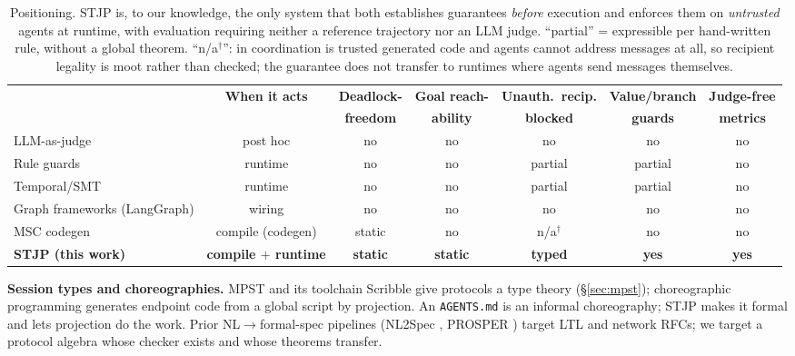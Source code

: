 \documentclass{article}
\newcommand{\stjp}{\textsc{STJP}}
\begin{document}
\begin{table}[t]
\centering\small
\caption{Positioning. \stjp{} is, to our knowledge, the only system that both establishes guarantees \emph{before} execution and enforces them on \emph{untrusted} agents at runtime, with evaluation requiring neither a reference trajectory nor an LLM judge. ``partial'' = expressible per hand-written rule, without a global theorem. ``n/a$^{\dagger}$'': in \citet{bollig26} coordination is trusted generated code and agents cannot address messages at all, so recipient legality is moot rather than checked; the guarantee does not transfer to runtimes where agents send messages themselves.}
\label{tab:position}
\begin{tabular}{@{}lcccccc@{}}
\toprule
& \textbf{When it acts} & \textbf{Deadlock-} & \textbf{Goal reach-} & \textbf{Unauth.\ recip.} & \textbf{Value/branch} & \textbf{Judge-free} \\
& & \textbf{freedom} & \textbf{ability} & \textbf{blocked} & \textbf{guards} & \textbf{metrics} \\
\midrule
LLM-as-judge & post hoc & no & no & no & no & no \\
Rule guards \citep{agentspec} & runtime & no & no & partial & partial & no \\
Temporal/SMT \citep{agentc} & runtime & no & no & partial & partial & no \\
Graph frameworks (LangGraph) & wiring & no & no & no & no & no \\
MSC codegen \citep{bollig26} & compile (codegen) & static & no & n/a$^{\dagger}$ & no & no \\
\textbf{\stjp{} (this work)} & \textbf{compile $+$ runtime} & \textbf{static} & \textbf{static} & \textbf{typed} & \textbf{yes} & \textbf{yes} \\
\bottomrule
\end{tabular}
\end{table}

\textbf{Session types and choreographies.} MPST \citep{hyc08,scalas19} and its toolchain Scribble \citep{scribble} give protocols a type theory (\S\ref{sec:mpst}); choreographic programming \citep{montesi23,carbone13} generates endpoint code from a global script by projection. An \texttt{AGENTS.md} is an informal choreography; \stjp{} makes it formal and lets projection do the work. Prior NL$\to$formal-spec pipelines (NL2Spec \citep{nl2spec}, PROSPER \citep{prosper}) target LTL and network RFCs; we target a protocol algebra whose checker exists and whose theorems transfer.
\end{document}
